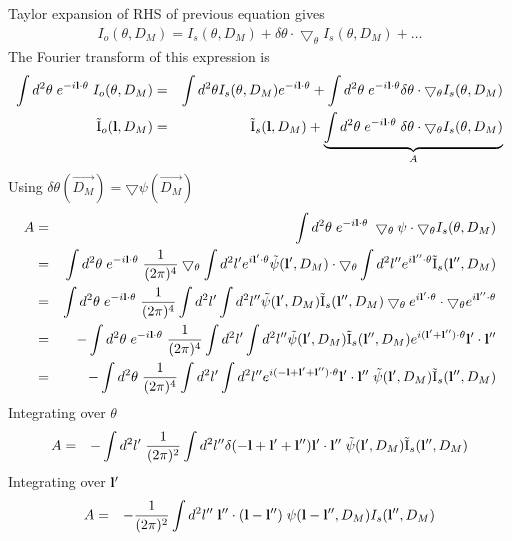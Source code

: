 \documentclass[12pt]{article}
\newcommand{\beqa}{\begin{eqnarray}}
\newcommand{\eeqa}{\end{eqnarray}}
\def\l{{\bf l}}
\def\iul{{\rm I}}
\def\il{{\tilde{\rm I}}}
\def\dtheta{\delta \theta}
\numberwithin{equation}{section}
\begin{document}
Taylor expansion of RHS of previous equation gives
\beqa
I_o(\theta,D_M) = I_s(\theta,D_M) + \delta\theta \cdot \bigtriangledown_\theta I_s(\theta,D_M) + \ldots
\eeqa
The Fourier transform of this expression is
\begin{eqnarray}
\int d^2 \theta \; e^{-i \l \cdot \theta} \; I_o(\theta,D_M) &=& \int d^2 \theta I_s(\theta,D_M) e^{-i \l \cdot \theta} + \int d^2 \theta \; e^{-i\l \cdot \theta} \delta\theta \cdot \bigtriangledown_\theta I_s(\theta,D_M)\nonumber\\
\il_o(\l,D_M) &=& \il_s(\l,D_M) + \underbrace{\int d^2 \theta \; e^{-i\l \cdot \theta} \; \delta\theta \cdot \bigtriangledown_\theta I_s(\theta,D_M)}_{A}
\end{eqnarray}
Using $\dtheta(\vec{D_M})=\bigtriangledown \psi(\vec{D_M})$
\begin{eqnarray}
A &= & \int d^2 \theta \; e^{-i\l \cdot \theta} \; \bigtriangledown_\theta \psi \cdot \bigtriangledown_\theta I_s(\theta,D_M) \\
&= & \int d^2 \theta \; e^{-i\l \cdot \theta} \; \frac{1}{(2\pi)^4}  \bigtriangledown_\theta \int d^2 l'  e^{i\l' \cdot \theta} \tilde{\psi}(\l', D_M) \cdot \bigtriangledown_\theta \int d^2 l''  e^{i\l'' \cdot \theta} \il_s(\l'',D_M)  \\
&= & \int d^2 \theta \; e^{-i\l \cdot \theta} \; \frac{1}{(2\pi)^4}  \int d^2 l' \int d^2 l''  \tilde{\psi}(\l', D_M) \il_s(\l'',D_M) \bigtriangledown_\theta e^{i\l' \cdot \theta}  \cdot  \bigtriangledown_\theta  e^{i\l'' \cdot \theta}   \\
&= & - \int d^2 \theta \; e^{-i\l \cdot \theta} \;  \frac{1}{(2\pi)^4}  \int d^2 l' \int d^2 l''  \tilde{\psi}(\l', D_M) \il_s(\l'',D_M) e^{i(\l' + \l'') \cdot \theta} \l' \cdot \l''\\
&= & -\int d^2 \theta \; \frac{1}{(2\pi)^4}  \int d^2 l' \int d^2 l''  e^{i(-\l + \l' + \l'') \cdot \theta} \l' \cdot \l'' \; \tilde{\psi}(\l', D_M) \il_s(\l'',D_M)
\end{eqnarray}
Integrating over $ \theta $
\begin{eqnarray}
A &= &- \int d^2 l' \; \frac{1}{(2\pi)^2}  \int d^2 l'' \delta(-\l + \l' + \l'') \l' \cdot \l'' \; \tilde{\psi}(\l', D_M) \il_s(\l'',D_M)
\end{eqnarray}
Integrating over $ \l' $
\begin{eqnarray}
A &= &- \frac{1}{(2\pi)^2} \int d^2 l'' \;  \l'' \cdot (\l - \l'') \; \psi(\l - \l'', D_M) I_s(\l'',D_M)
\end{eqnarray}
\end{document}

